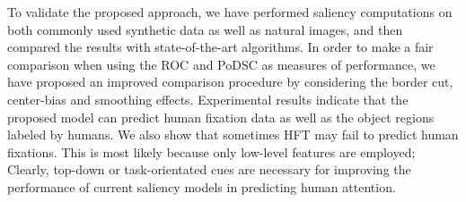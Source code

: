 \documentclass[10pt,journal,cspaper,compsoc]{IEEEtran}
\begin{document}
To validate the proposed approach, we have performed saliency computations on both commonly used synthetic data as well as natural images, and then compared the results with state-of-the-art algorithms. In order to make a fair comparison when using the ROC and PoDSC as measures of performance, we have proposed an improved comparison procedure by considering the border cut, center-bias and smoothing effects. Experimental results indicate that the proposed model can predict human fixation data as well as the object regions labeled by humans. We also show that sometimes HFT may fail to predict human fixations. This is most likely because only low-level features are employed; Clearly, top-down or task-orientated cues are necessary for improving the performance of current saliency models in predicting human attention.
\end{document}
